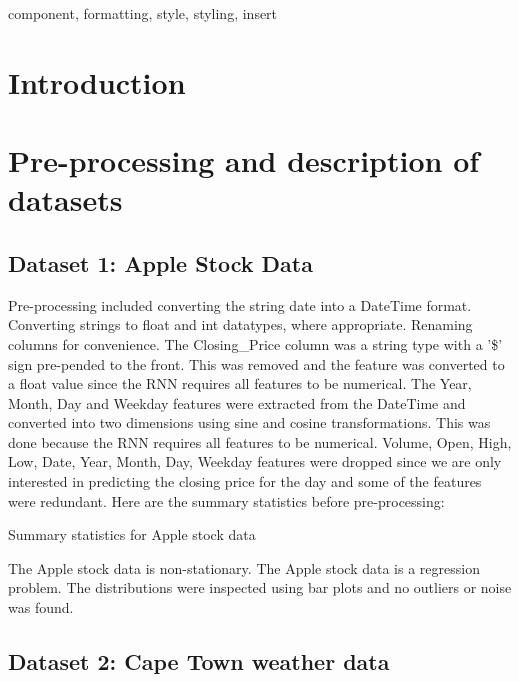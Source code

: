\documentclass[conference]{IEEEtran}
\begin{document}
\begin{IEEEkeywords}
component, formatting, style, styling, insert
\end{IEEEkeywords}

\section{Introduction}


\section{Pre-processing and description of datasets}

\subsection{Dataset 1: Apple Stock Data}

Pre-processing included converting the string date into a DateTime format. Converting strings to float and int datatypes, where appropriate. Renaming columns for convenience. The Closing\_Price column was a string type with a '\$' sign pre-pended to the front. This was removed and the feature was converted to a float value since the RNN requires all features to be numerical. The Year, Month, Day and Weekday features were extracted from the DateTime and converted into two dimensions using sine and cosine transformations. This was done because the RNN requires all features to be numerical. Volume, Open, High, Low, Date, Year, Month, Day, Weekday features were dropped since we are only interested in predicting the closing price for the day and some of the features were redundant. Here are the summary statistics before pre-processing:

\begin{table}[htbp]
	\caption{Summary statistics for Apple stock data}
	\label{tab:apple-stats}
\end{table}

The Apple stock data is non-stationary. The Apple stock data is a regression problem. The distributions were inspected using bar plots and no outliers or noise was found.

\subsection{Dataset 2: Cape Town weather data}
\end{document}
